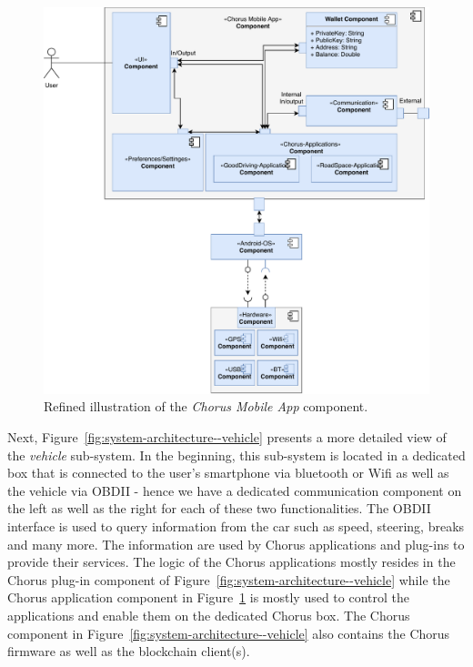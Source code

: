 \documentclass{llncs}
\begin{document}
{				\begin{figure}
					\centering
					\includegraphics[scale=0.6]{Figures/longterm-architecture/20180507_Refined-sys-architecture--mobile-app.pdf}
					\caption{Refined illustration of the \textit{Chorus Mobile App} component.}	
					\label{fig:system-architecture--app}
				\end{figure}
				Next, Figure~\ref{fig:system-architecture--vehicle} presents a more detailed view of the \textit{vehicle} sub-system. In the beginning, this sub-system is located in a dedicated box that is connected to the user's smartphone via bluetooth or Wifi as  well as the vehicle via OBDII - hence we have a dedicated communication component on the left as well as the right for each of these two functionalities. The OBDII interface is used to query information from the car such as speed, steering, breaks and many more. The information are used by Chorus applications and plug-ins to provide their services. The logic of the Chorus applications mostly resides in the Chorus plug-in component of Figure~\ref{fig:system-architecture--vehicle} while the Chorus application component in Figure~\ref{fig:system-architecture--app} is mostly used to control the applications and enable them on the dedicated Chorus box. The Chorus component in Figure~\ref{fig:system-architecture--vehicle} also contains the Chorus firmware as well as the blockchain client(s). 
			
}
\end{document}
